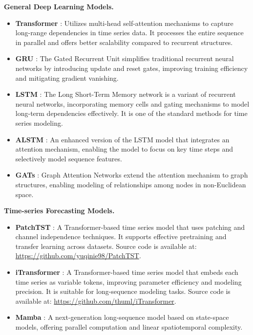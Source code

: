 \documentclass{article}
\begin{document}
\textbf{ General Deep Learning Models.}
\begin{itemize}[leftmargin=4ex]
    \item \textbf{Transformer} \cite{NIPS2017_3f5ee243}: Utilizes multi-head self-attention mechanisms to capture long-range dependencies in time series data. It processes the entire sequence in parallel and offers better scalability compared to recurrent structures.
    \item \textbf{GRU} \cite{cho-etal-2014-learning}: The Gated Recurrent Unit simplifies traditional recurrent neural networks by introducing update and reset gates, improving training efficiency and mitigating gradient vanishing.
    \item \textbf{LSTM} \cite{hochreiter1997long}: The Long Short-Term Memory network is a variant of recurrent neural networks, incorporating memory cells and gating mechanisms to model long-term dependencies effectively. It is one of the standard methods for time series modeling.
    \item \textbf{ALSTM} \cite{qin2017dual}: An enhanced version of the LSTM model that integrates an attention mechanism, enabling the model to focus on key time steps and selectively model sequence features.
    \item \textbf{GATs} \cite{velivckovic2018graph}: Graph Attention Networks extend the attention mechanism to graph structures, enabling modeling of relationships among nodes in non-Euclidean space.
\end{itemize}

\textbf{ Time-series Forecasting Models.}
\begin{itemize}[leftmargin=4ex]
    \item \textbf{PatchTST} \cite{nietime}: A Transformer-based time series model that uses patching and channel independence techniques. It supports effective pretraining and transfer learning across datasets. Source code is available at: \url{https://github.com/yuqinie98/PatchTST}.
    \item \textbf{iTransformer} \cite{liuitransformer}: A Transformer-based time series model that embeds each time series as variable tokens, improving parameter efficiency and modeling precision. It is suitable for long-sequence modeling tasks. Source code is available at: \url{https://github.com/thuml/iTransformer}.
    \item \textbf{Mamba} \cite{gumamba}: A next-generation long-sequence model based on state-space models, offering parallel computation and linear spatiotemporal complexity.
\end{itemize}
\end{document}
